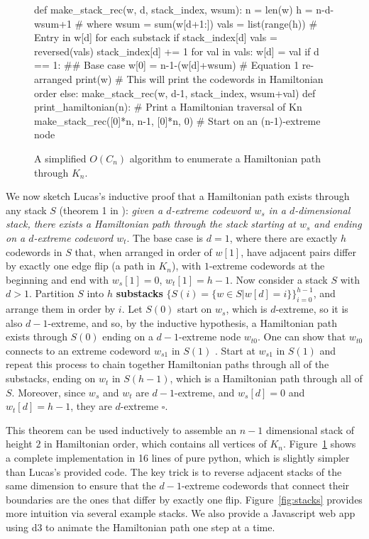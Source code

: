 \documentclass[english]{socg-lipics-v2021}
\begin{document}
\begin{figure}
    \begin{python}
def make_stack_rec(w, d, stack_index, wsum): 
    n = len(w)
    h = n-d-wsum+1 # where wsum = sum(w[d+1:])
    vals = list(range(h)) # Entry in w[d] for each substack
    if stack_index[d]%
        vals = reversed(vals)
    stack_index[d] += 1
    for val in vals:
        w[d] = val
        if d == 1: ## Base case
            w[0] = n-1-(w[d]+wsum) # Equation 1 re-arranged
            print(w) # This will print the codewords in Hamiltonian order
        else:
            make_stack_rec(w, d-1, stack_index, wsum+val)
def print_hamiltonian(n): # Print a Hamiltonian traversal of Kn
    make_stack_rec([0]*n, n-1, [0]*n, 0) # Start on an (n-1)-extreme node
        \end{python}
    \caption{A simplified $O(C_n)$ algorithm to enumerate a Hamiltonian path through $K_n$.}
    \label{fig:algorithm}
\end{figure}

We now sketch Lucas's inductive proof that a Hamiltonian path exists through any stack $S$ (theorem 1 in \cite{lucas1987rotation}): {\em given a $d$-extreme codeword $w_s$ in a $d$-dimensional stack, there exists a Hamiltonian path through the stack starting at $w_s$ and ending on a $d$-extreme codeword $w_t$}. The base case is $d=1$, where there are exactly $h$ codewords in $S$ that, when arranged in order of $w[1]$, have adjacent pairs differ by exactly one edge flip (a path in $K_n$), with $1$-extreme codewords at the beginning and end with $w_s[1] = 0$, $w_t[1] = h-1$.  Now consider a stack $S$ with $d > 1$.  Partition $S$ into $h$ {\bf substacks} $\{S(i) = \{w \in S | w[d] = i\} \}_{i=0}^{h-1}$, and arrange them in order by $i$.  Let $S(0)$ start on $w_s$, which is $d$-extreme, so it is also $d-1$-extreme, and so, by the inductive hypothesis, a Hamiltonian path exists through $S(0)$ ending on a $d-1$-extreme node $w_{t0}$.  One can show that $w_{t0}$ connects to an extreme codeword $w_{s1}$ in $S(1)$ \cite{lucas1987rotation}.  Start at $w_{s1}$ in $S(1)$ and repeat this process to chain together Hamiltonian paths through all of the substacks, ending on $w_t$ in $S(h-1)$, which is a Hamiltonian path through all of $S$.  Moreover, since $w_s$ and $w_t$ are $d-1$-extreme,  and $w_s[d] = 0$ and $w_t[d] = h-1$, they are $d$-extreme $\square$.

This theorem can be used inductively to assemble an $n-1$ dimensional stack of height $2$ in Hamiltonian order, which contains all vertices of $K_n$.  Figure~\ref{fig:algorithm} shows a complete implementation in 16 lines of pure python, which is slightly simpler than Lucas's provided code.  The key trick is to reverse adjacent stacks of the same dimension to ensure that the $d-1$-extreme codewords that connect their boundaries are the ones that differ by exactly one flip.  Figure~\ref{fig:stacks} provides more intuition via several example stacks.  We also provide a Javascript web app using d3 \cite{bostock2011d3} to animate the Hamiltonian path one step at a time.
\end{document}
